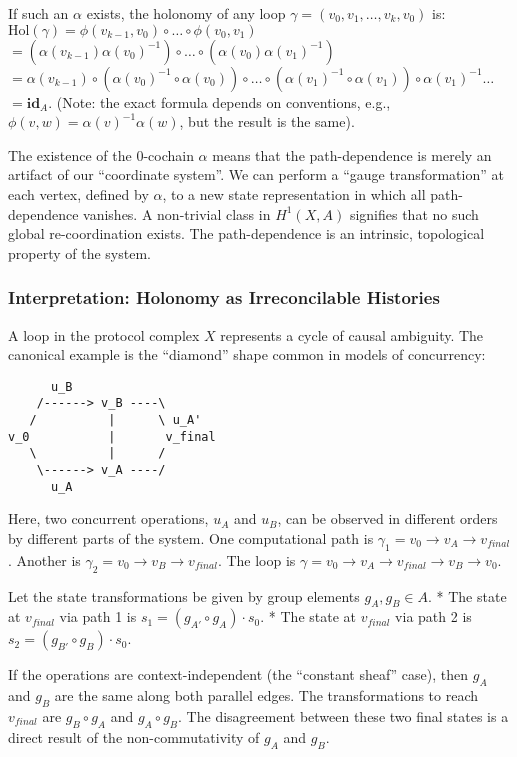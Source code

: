 \documentclass[
]{article}
\begin{document}
If such an \(\alpha\) exists, the holonomy of any loop
\(\gamma = (v_0, v_1, \dots, v_k, v_0)\) is:
\(\text{Hol}(\gamma) = \phi(v_{k-1}, v_0) \circ \dots \circ \phi(v_0, v_1)\)
\(= (\alpha(v_{k-1})\alpha(v_0)^{-1}) \circ \dots \circ (\alpha(v_0)\alpha(v_1)^{-1})\)
\(= \alpha(v_{k-1}) \circ (\alpha(v_0)^{-1} \circ \alpha(v_0)) \circ \dots \circ (\alpha(v_1)^{-1} \circ \alpha(v_1)) \circ \alpha(v_1)^{-1} \dots\)
\(= \mathbf{id}_A\). (Note: the exact formula depends on conventions,
e.g., \(\phi(v,w) = \alpha(v)^{-1} \alpha(w)\), but the result is the
same).

The existence of the 0-cochain \(\alpha\) means that the path-dependence
is merely an artifact of our ``coordinate system''. We can perform a
``gauge transformation'' at each vertex, defined by \(\alpha\), to a new
state representation in which all path-dependence vanishes. A
non-trivial class in \(H^1(X, A)\) signifies that no such global
re-coordination exists. The path-dependence is an intrinsic, topological
property of the system.

\subsubsection{Interpretation: Holonomy as Irreconcilable
Histories}\label{interpretation-holonomy-as-irreconcilable-histories}

A loop in the protocol complex \(X\) represents a cycle of causal
ambiguity. The canonical example is the ``diamond'' shape common in
models of concurrency:

\begin{verbatim}
      u_B
    /------> v_B ----\
   /          |      \ u_A'
v_0           |       v_final
   \          |      /
    \------> v_A ----/
      u_A
\end{verbatim}

Here, two concurrent operations, \(u_A\) and \(u_B\), can be observed in
different orders by different parts of the system. One computational
path is \(\gamma_1 = v_0 \to v_A \to v_{final}\). Another is
\(\gamma_2 = v_0 \to v_B \to v_{final}\). The loop is
\(\gamma = v_0 \to v_A \to v_{final} \to v_B \to v_0\).

Let the state transformations be given by group elements
\(g_A, g_B \in A\). * The state at \(v_{final}\) via path 1 is
\(s_1 = (g_{A'} \circ g_A) \cdot s_0\). * The state at \(v_{final}\) via
path 2 is \(s_2 = (g_{B'} \circ g_B) \cdot s_0\).

If the operations are context-independent (the ``constant sheaf'' case),
then \(g_A\) and \(g_B\) are the same along both parallel edges. The
transformations to reach \(v_{final}\) are \(g_B \circ g_A\) and
\(g_A \circ g_B\). The disagreement between these two final states is a
direct result of the non-commutativity of \(g_A\) and \(g_B\).
\end{document}
